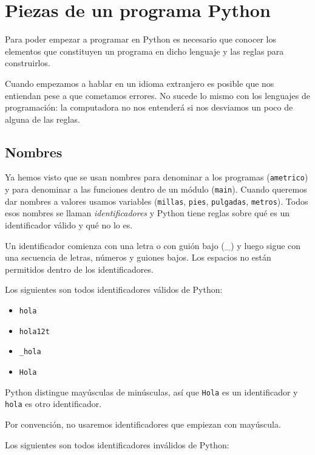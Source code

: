 \section {Piezas de un programa Python}
Para poder empezar a programar en Python es necesario que conocer los elementos
que constituyen un programa en dicho lenguaje y las reglas para construirlos.

\begin{observacion}
Cuando empezamos a hablar en un idioma extranjero es posible que nos entiendan
pese a que cometamos errores. No sucede lo mismo con los lenguajes de
programación: la computadora no nos entenderá si nos desviamos un poco de
alguna de las reglas.
\end{observacion}

\subsection{Nombres}
Ya hemos visto que se usan nombres para denominar a los programas
(\lstinline!ametrico!) y para denominar a las funciones dentro de un
módulo (\lstinline!main!). Cuando queremos dar nombres a valores usamos
variables (\lstinline!millas!, \lstinline!pies!, \lstinline!pulgadas!,
\lstinline!metros!). Todos esos nombres se llaman {\it identificadores}
y Python tiene reglas sobre qué es un identificador válido y qué
no lo es.

Un identificador comienza con una letra o con guión bajo (\_) y
luego sigue con una secuencia de letras, números y guiones bajos.
Los espacios no están permitidos dentro de los identificadores.

Los siguientes son todos identificadores válidos de Python:

\begin{itemize}
\item \lstinline!hola!
\item \lstinline!hola12t!
\item \lstinline!_hola!
\item \lstinline!Hola!
\end{itemize}

Python distingue mayúsculas de minúsculas, así que \lstinline!Hola! es
un identificador y \lstinline!hola! es otro identificador.

\begin{observacion}
Por convención, no usaremos identificadores que empiezan con mayúscula.
\end{observacion}

Los siguientes son todos identificadores inválidos de Python:

